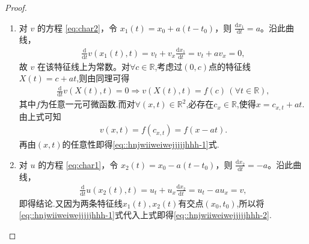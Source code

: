 \documentclass[../../main.tex]{subfiles}%
\begin{document}
\begin{proof}
\begin{enumerate}[(1)]
\item 对 $v$ 的方程 \eqref{eq:char2}，令 $x_1(t)=x_0+a(t-t_0)$，则 $\frac{\mathrm{d}x_1}{\mathrm{d}t}=a$。沿此曲线，
\begin{align*}
\frac{\mathrm{d}}{\mathrm{d}t}v(x_1(t),t)
= v_t + v_x \frac{\mathrm{d}x_1}{\mathrm{d}t}
= v_t + a v_x = 0,
\end{align*}
故 $v$ 在该特征线上为常数。对$\forall c\in \mathbb{R}$,考虑过$(0,c)$点的特征线$X(t)=c+at$,则由同理可得
\begin{align*}
\frac{\mathrm{d}}{\mathrm{d}t}v(X(t),t) = 0\Longrightarrow v(X(t),t)= f(c)\,(\forall t\in \mathbb{R}),
\end{align*}
其中$f$为任意一元可微函数.而对$\forall (x,t)\in \mathbb{R}^2$,必存在$c_x\in \mathbb{R}$,使得$x=c_{x,t}+at$.由上式可知
\begin{align*}
v(x,t)=f(c_{x,t})=f(x-at).
\end{align*}
再由$(x,t)$的任意性即得\eqref{eq::hnjwiiweiwejjjjjhhh-1}式.

\item 对 $u$ 的方程 \eqref{eq:char1}，令 $x_2(t)=x_0-a(t-t_0)$，则 $\frac{\mathrm{d}x_2}{\mathrm{d}t}=-a$。沿此曲线，
\begin{align*}
\frac{\mathrm{d}}{\mathrm{d}t}u(x_2(t),t)
= u_t + u_x \frac{\mathrm{d}x_2}{\mathrm{d}t}
= u_t - a u_x = v,
\end{align*}
即得结论.又因为两条特征线$x_1(t),x_2(t)$有交点$(x_0,t_0)$,所以将\eqref{eq::hnjwiiweiwejjjjjhhh-1}式代入上式即得\eqref{eq::hnjwiiweiwejjjjjhhh-2}.
\end{enumerate}
\end{proof}
\end{document}
